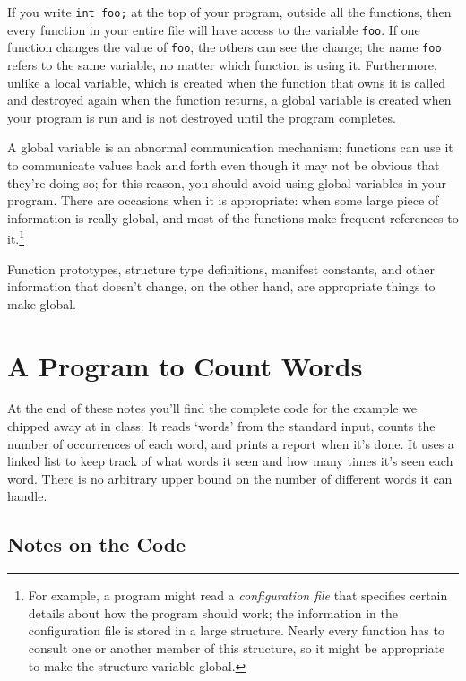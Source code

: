 If you write {\tt int foo;} at the top of your program, outside all the
functions, then every function in your entire file will have access to
the variable {\tt foo}.  If one function changes the value of {\tt foo},
the others can see the change; the name {\tt foo} refers to the same
variable, no matter which function is using it.  Furthermore, unlike a
local variable, which is created when the function that owns it is
called and destroyed again when the function returns, a global variable
is created when your program is run and is not destroyed until the
program completes.

A global variable is an abnormal communication mechanism; functions can
use it to communicate values back and forth even though it may not be
obvious that they're doing so; for this reason, you should avoid using
global variables in your program.  There are occasions when it is
appropriate: when some large piece of information is really global, and
most of the functions make frequent references to it.\footnote{For
example, a program might read a {\em configuration file} that specifies
certain details about how the program should work; the information in
the configuration file is stored in a large structure.  Nearly every
function has to consult one or another member of this structure, so it
might be appropriate to make the structure variable global.}

Function prototypes, structure type definitions, manifest constants, and
other information that doesn't change, on the other hand, are
appropriate things to make global.

\section{A Program to Count Words}

At the end of these notes you'll find the complete code for the example
we chipped away at in class: It reads `words' from the standard input,
counts the number of occurrences of each word, and prints a report when
it's done.  It uses a linked list to keep track of what words it seen
and how many times it's seen each word.  There is no arbitrary upper
bound on the number of different words it can handle.

{  }

\subsection{Notes on the Code}

